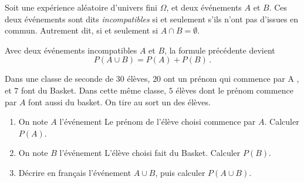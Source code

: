 \documentclass{article}
\begin{document}
\begin{remark}
\begin{center}
\end{center}
\end{remark}
\begin{definitionbox}
Soit une expérience aléatoire d'univers fini $\Omega$, et deux événements $A$ et $B$. Ces deux événements sont dits \emph{incompatibles} si et seulement s'ils n'ont pas d'issues en commun. Autrement dit, si et seulement si $A \cap B = \emptyset$.
\end{definitionbox}
\begin{proposition}
Avec deux événements incompatibles $A$ et $B$, la formule précédente devient
\begin{equation*}
P(A \cup B) = P(A) + P(B)\,.
\end{equation*}
\end{proposition}
\vspace*{0.5cm}
\begin{example}
Dans une classe de seconde de $30$ élèves, $20$ ont un prénom qui commence par \og A \fg, et $7$ font du Basket. Dans cette même classe, $5$ élèves dont le prénom commence par $A$ font aussi du basket. On tire au sort un des élèves.
\begin{enumerate}[label=\emph{\alph*)}]
\item On note $A$ l'événement \og Le prénom de l'élève choisi commence par $A$\fg. Calculer $P(A)$. 
\item On note $B$ l'événement \og L'élève choisi fait du Basket\fg. Calculer $P(B)$.
\item Décrire en français l'événement $A \cup B$, puis calculer $P(A \cup B)$.
\end{enumerate}
\emptybox{4cm}
\vspace*{0.5cm}
\end{example}
\end{document}
